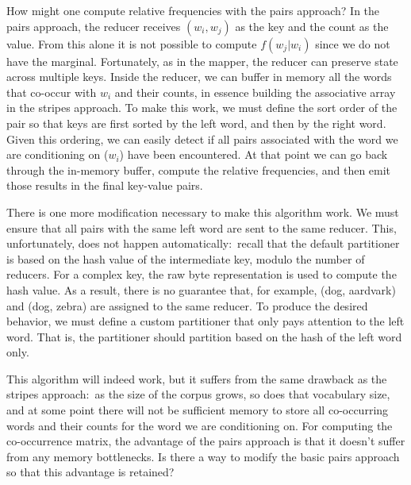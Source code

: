 \documentclass[11pt]{article}
\begin{document}
How might one compute relative frequencies with the pairs approach?
In the pairs approach, the reducer receives $(w_i, w_j)$ as the key and
the count as the value.  From this alone it is not possible to compute
$f(w_j|w_i)$ since we do not have the marginal.  Fortunately, as in the
mapper, the reducer can preserve state across multiple keys.  Inside
the reducer, we can buffer in memory all the words that co-occur with
$w_i$ and their counts, in essence building the associative array in the
stripes approach.  To make this work, we must define the sort order of
the pair so that keys are first sorted by the left word, and then by
the right word.  Given this ordering, we can easily detect if all
pairs associated with the word we are conditioning on ($w_i$) have been
encountered.  At that point we can go back through the in-memory
buffer, compute the relative frequencies, and then emit those results
in the final key-value pairs.

There is one more modification necessary to make this algorithm work.
We must ensure that all pairs with the same left word are sent to the
same reducer.  This, unfortunately, does not happen
automatically:\ recall that the default partitioner is based on the
hash value of the intermediate key, modulo the number of reducers.
For a complex key, the raw byte representation is used to compute the
hash value.  As a result, there is no guarantee that, for example,
(dog, aardvark) and (dog, zebra) are assigned to the same reducer.  To
produce the desired behavior, we must define a custom partitioner that
only pays attention to the left word.  That is, the partitioner should
partition based on the hash of the left word only.

This algorithm will indeed work, but it suffers from the same drawback
as the stripes approach:\ as the size of the corpus grows, so does
that vocabulary size, and at some point there will not be sufficient
memory to store all co-occurring words and their counts for the word
we are conditioning on.  For computing the co-occurrence matrix, the
advantage of the pairs approach is that it doesn't suffer from any
memory bottlenecks.  Is there a way to modify the basic pairs approach
so that this advantage is retained?
\end{document}
